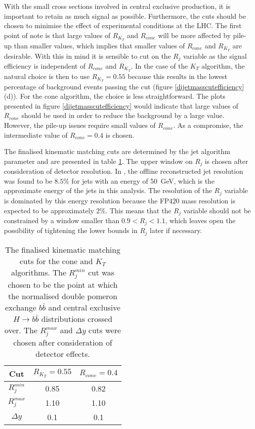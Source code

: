 With the small cross sections involved in central exclusive production, it is important to retain as much signal as possible. Furthermore, the cuts should be chosen to minimise the effect of experimental conditions at the LHC. The first point of note is that large values of $R_{K_T}$ and $R_{cone}$ will be more affected by pile-up than smaller values, which implies that smaller values of $R_{cone}$ and $R_{K_T}$ are desirable. With this in mind it is sensible to cut on the $R_j$ variable as the signal efficiency is independent of $R_{cone}$ and $R_{K_T}$. In the case of the $K_T$ algorithm, the natural choice is then to use $R_{K_T} = 0.55$ because this results in the lowest percentage of background events passing the cut (figure \ref{dijetmasscutefficiency} (d)).
 For the cone algorithm, the choice is less straightforward. The plots presented in figure \ref{dijetmasscutefficiency} would indicate that large values of $R_{cone}$ should be used in order to reduce the background by a large value. However, the pile-up issues require small values of $R_{cone}$. As a compromise, the intermediate value of $R_{cone} = 0.4$ is chosen.

The finalised kinematic matching cuts are determined by the jet algorithm parameter and are presented in table \ref{kinematch}. The upper window on $R_{j}$ is chosen after consideration of detector resolution. In \cite{:1999fq:Chapter9}, the offline reconstructed jet resolution was found to be $8.5\%$ for jets with an energy of 50~GeV, which is the approximate energy of the jets in this analysis. The resolution of the $R_j$ variable is dominated by this energy resolution because the FP420 mass resolution is expected to be approximately 2\%. This means that the $R_j$ variable should not be constrained by a window smaller than $0.9<R_j<1.1$, which leaves open the possibility of tightening the lower bounds in $R_{j}$ later if necessary.

\begin{table}[t]
\centering
\begin{tabular}{|c|c|c|}
\hline
Cut & $R_{K_T}=0.55$ & $R_{cone}=0.4$ \\
\hline
$R_{j}^{min}$ & 0.85 & 0.82 \\
$R_{j}^{max}$ & 1.10 & 1.10 \\
$\Delta y$ & 0.1 & 0.1 \\ 
\hline
\end{tabular}
\caption[Kinematic matching cuts to distinguish between the DPE and CEP processes]{The finalised kinematic matching cuts for the cone and $K_T$ algorithms. The $R_j^{min}$ cut was chosen to be the point at which the normalised double pomeron exchange $b\bar{b}$ and central exclusive $H\rightarrow b\bar{b}$ distributions crossed over. The $R_{j}^{max}$ and $\Delta y$ cuts were chosen after consideration of detector effects. \label{kinematch}}
\end{table}%



